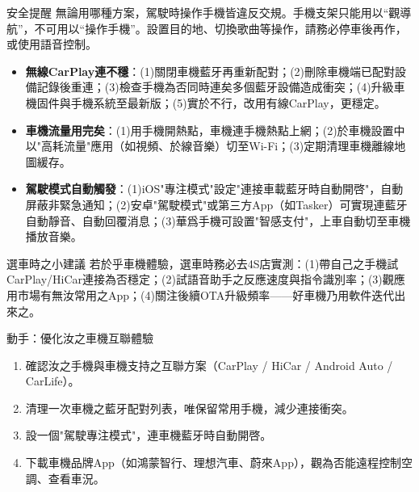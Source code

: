 \begin{tcbwarn}{安全提醒}
無論用哪種方案，駕駛時操作手機皆違反交規。手機支架只能用以“觀導航”，不可用以“操作手機”。設置目的地、切換歌曲等操作，請務必停車後再作，或使用語音控制。

\end{tcbwarn}


\begin{itemize}
  \item \textbf{無線CarPlay連不穩}：(1)關閉車機藍牙再重新配對；(2)刪除車機端已配對設備記錄後重連；(3)檢查手機為否同時連矣多個藍牙設備造成衝突；(4)升級車機固件與手機系統至最新版；(5)實於不行，改用有線CarPlay，更穩定。
  \item \textbf{車機流量用完矣}：(1)用手機開熱點，車機連手機熱點上網；(2)於車機設置中以"高耗流量"應用（如視頻、於線音樂）切至Wi-Fi；(3)定期清理車機離線地圖緩存。
  \item \textbf{駕駛模式自動觸發}：(1)iOS"專注模式"設定"連接車載藍牙時自動開啓"，自動屏蔽非緊急通知；(2)安卓"駕駛模式"或第三方App（如Tasker）可實現連藍牙自動靜音、自動回覆消息；(3)華爲手機可設置"智感支付"，上車自動切至車機播放音樂。
\end{itemize}

\begin{tcbinfo}{選車時之小建議}
若於乎車機體驗，選車時務必去4S店實測：(1)帶自己之手機試CarPlay/HiCar連接為否穩定；(2)試語音助手之反應速度與指令識別率；(3)觀應用市場有無汝常用之App；(4)關注後續OTA升級頻率——好車機乃用軟件迭代出來之。

\end{tcbinfo}

\begin{tcbpractice}{動手：優化汝之車機互聯體驗}
\begin{enumerate}
  \item 確認汝之手機與車機支持之互聯方案（CarPlay / HiCar / Android Auto / CarLife）。
  \item 清理一次車機之藍牙配對列表，唯保留常用手機，減少連接衝突。
  \item 設一個"駕駛專注模式"，連車機藍牙時自動開啓。
  \item 下載車機品牌App（如鴻蒙智行、理想汽車、蔚來App），觀為否能遠程控制空調、查看車況。
\end{enumerate}

\end{tcbpractice}

